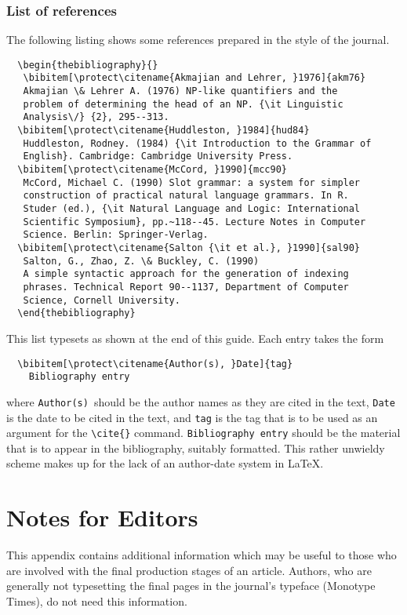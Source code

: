 \documentclass{jfp}
\begin{document}
\subsubsection{List of references}\label{fullref}

The following listing shows some references prepared in the style of the
journal.
%
{\fontsize{7}{9}\selectfont
\begin{verbatim}
  \begin{thebibliography}{}
   \bibitem[\protect\citename{Akmajian and Lehrer, }1976]{akm76}
   Akmajian \& Lehrer A. (1976) NP-like quantifiers and the
   problem of determining the head of an NP. {\it Linguistic
   Analysis\/} {2}, 295--313.
  \bibitem[\protect\citename{Huddleston, }1984]{hud84}
   Huddleston, Rodney. (1984) {\it Introduction to the Grammar of
   English}. Cambridge: Cambridge University Press.
  \bibitem[\protect\citename{McCord, }1990]{mcc90}
   McCord, Michael C. (1990) Slot grammar: a system for simpler
   construction of practical natural language grammars. In R.
   Studer (ed.), {\it Natural Language and Logic: International
   Scientific Symposium}, pp.~118--45. Lecture Notes in Computer
   Science. Berlin: Springer-Verlag.
  \bibitem[\protect\citename{Salton {\it et al.}, }1990]{sal90}
   Salton, G., Zhao, Z. \& Buckley, C. (1990)
   A simple syntactic approach for the generation of indexing
   phrases. Technical Report 90--1137, Department of Computer
   Science, Cornell University.
  \end{thebibliography}
\end{verbatim}}
%
This list typesets as shown at the end of this guide.
Each entry takes the form
%
\begin{verbatim}
  \bibitem[\protect\citename{Author(s), }Date]{tag}
    Bibliography entry
\end{verbatim}
%
where \verb"Author(s)"\ should be the author names as they are cited in
the text, \verb"Date" is the date to be cited in the text, and \verb"tag"
is the tag that is to be used as an argument for the \verb"\cite{}" command.
\verb"Bibliography entry" should be the
material that is to appear in the bibliography, suitably formatted.  This
rather unwieldy scheme makes up for the lack of an author-date system in
LaTeX.

\section{Notes for Editors}

This appendix contains additional information which may be useful to
those who are involved with the final production stages of an article.
Authors, who are generally not typesetting the final pages in the
journal's typeface (Monotype Times), do not need this information.
\end{document}
